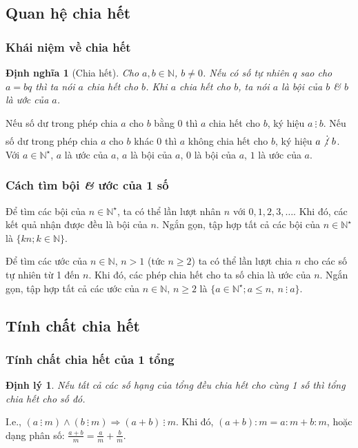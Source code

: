 \documentclass[oneside]{book}
\numberwithin{equation}{section}
\newtheorem{dinhnghia}{Định nghĩa}[section]
\newtheorem{dinhly}{Định lý}[section]
\begin{document}
\subsection{Quan hệ chia hết}

\subsubsection{Khái niệm về chia hết}
\begin{dinhnghia}[Chia hết]
	Cho $a,b\in\mathbb{N}$, $b\ne 0$. Nếu có số tự nhiên $q$ sao cho $a = bq$ thì ta nói \emph{$a$ chia hết cho $b$}. Khi $a$ chia hết cho $b$, ta nói $a$ là \emph{bội} của $b$ \textit{\&} $b$ là \emph{ước} của $a$.
\end{dinhnghia}
Nếu số dư trong phép chia $a$ cho $b$ bằng 0 thì $a$ chia hết cho $b$, ký hiệu $a\ \vdots\ b$. Nếu số dư trong phép chia $a$ cho $b$ khác 0 thì $a$ không chia hết cho $b$, ký hiệu $a\not\vdots\ b$. Với $a\in\mathbb{N}^\star$, $a$ là ước của $a$, $a$ là bội của $a$, 0 là bội của $a$, $1$ là ước của $a$.

\subsubsection{Cách tìm bội \textit{\&} ước của 1 số}
Để tìm các bội của $n\in\mathbb{N}^\star$, ta có thể lần lượt nhân $n$ với $0,1,2,3,\ldots$. Khi đó, các kết quả nhận được đều là bội của $n$. Ngắn gọn, tập hợp tất cả các bội của $n\in\mathbb{N}^\star$ là $\{kn;k\in\mathbb{N}\}$.

Để tìm các ước của $n\in\mathbb{N}$, $n > 1$ (tức $n\ge 2$) ta có thể lần lượt chia $n$ cho các số tự nhiên từ 1 đến $n$. Khi đó, các phép chia hết cho ta số chia là ước của $n$. Ngắn gọn, tập hợp tất cả các ước của $n\in\mathbb{N}$, $n\ge 2$ là $\{a\in\mathbb{N}^\star;a\le n,\ n\ \vdots\ a\}$.

\subsection{Tính chất chia hết}

\subsubsection{Tính chất chia hết của 1 tổng}
\begin{dinhly}
	Nếu tất cả các số hạng của tổng đều chia hết cho cùng 1 số thì tổng chia hết cho số đó.
\end{dinhly}
I.e., $(a\ \vdots\ m)\land(b\ \vdots\ m)\Rightarrow(a + b)\ \vdots\ m$. Khi đó, $(a + b):m = a:m + b:m$, hoặc dạng phân số: $\frac{a + b}{m} = \frac{a}{m} + \frac{b}{m}$.
\end{document}
